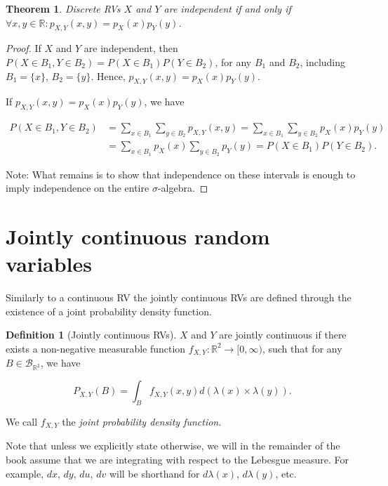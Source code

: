 \documentclass{book}
\theoremstyle{plain}%
\newtheorem{theorem}{Theorem}[section]
\theoremstyle{definition}
\newtheorem{definition}{Definition}[section]
\newlength{\arrow}
\begin{document}
\begin{theorem}
Discrete RVs $X$ and $Y$ are independent if and only if $\forall x,y \in \mathbb{R}: p_{X,Y}(x,y) = p_X(x)p_Y(y)$.
\end{theorem}

\begin{proof}
If $X$ and $Y$ are independent, then $P(X \in B_1, Y \in B_2) = P(X \in B_1)P(Y \in B_2)$, for any $B_1$ and $B_2$, including $B_1 = \{x\}$, $B_2 = \{y\}$. Hence, $p_{X,Y}(x,y) = p_X(x)p_Y(y)$.

If $p_{X,Y}(x,y) = p_X(x)p_Y(y)$, we have 

\begin{align*}
P(X \in B_1, Y \in B_2) &= \sum_{x \in B_1} \sum_{y \in B_2} p_{X,Y}(x,y) = \sum_{x \in B_1} \sum_{y \in B_2} p_{X}(x)p_{Y}(y)\\
&=\sum_{x \in B_1} p_{X}(x) \sum_{y \in B_2} p_{Y}(y) = P(X \in B_1)P(Y \in B_2).
\end{align*}

Note: What remains is to show that independence on these intervals is enough to imply independence on the entire $\sigma$-algebra.

\end{proof}

\section{Jointly continuous random variables}

Similarly to a continuous RV the jointly continuous RVs are defined through the existence of a joint probability density function.

\begin{definition}[Jointly continuous RVs]
$X$ and $Y$ are jointly continuous if there exists a non-negative measurable function $f_{X,Y}:\mathbb{R}^2 \rightarrow [0, \infty)$, such that for any $B \in \mathcal{B}_{\mathbb{R}^2}$, we have 

$$P_{X,Y}(B) = \int_{B} f_{X,Y}(x, y) d(\lambda(x) \times \lambda(y)).$$

We call $f_{X,Y}$ the \emph{joint probability density function}.
\end{definition}

Note that unless we explicitly state otherwise, we will in the remainder of the book assume that we are integrating with respect to the Lebesgue measure. For example, $dx$, $dy$, $du$, $dv$ will be shorthand for $d\lambda(x)$, $d\lambda(y)$, etc.
\end{document}
